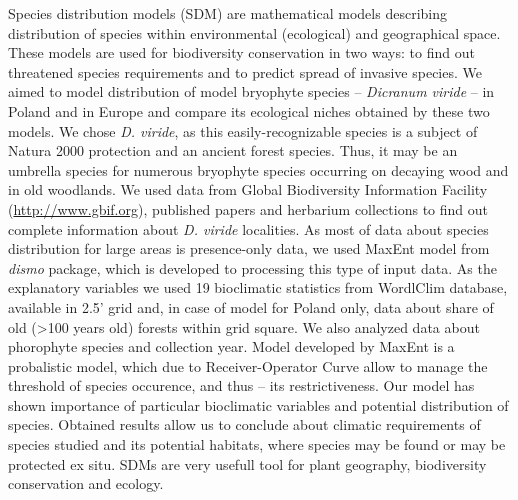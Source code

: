 \documentclass[\main/boa.tex]{subfiles}
\begin{document}
Species distribution models (SDM) are mathematical models describing
distribution of species within environmental (ecological) and
geographical space. These models are used for biodiversity conservation
in two ways: to find out threatened species requirements and to predict
spread of invasive species. We aimed to model distribution of model
bryophyte species -- \emph{Dicranum viride} -- in Poland and in Europe
and compare its ecological niches obtained by these two models. We chose
\emph{D. viride}, as this easily-recognizable species is a subject of
Natura 2000 protection and an ancient forest species. Thus, it may be an
umbrella species for numerous bryophyte species occurring on decaying
wood and in old woodlands. We used data from Global Biodiversity
Information Facility (\url{http://www.gbif.org}), published papers and
herbarium collections to find out complete information about \emph{D.
viride} localities. As most of data about species distribution for large
areas is presence-only data, we used MaxEnt model from \emph{dismo}
package, which is developed to processing this type of input data. As
the explanatory variables we used 19 bioclimatic statistics from
WordlClim database, available in 2.5' grid and, in case of model for
Poland only, data about share of old (\textgreater{}100 years old)
forests within grid square. We also analyzed data about phorophyte
species and collection year. Model developed by MaxEnt is a probalistic
model, which due to Receiver-Operator Curve allow to manage the
threshold of species occurence, and thus -- its restrictiveness. Our
model has shown importance of particular bioclimatic variables and
potential distribution of species. Obtained results allow us to conclude
about climatic requirements of species studied and its potential
habitats, where species may be found or may be protected ex situ. SDMs
are very usefull tool for plant geography, biodiversity conservation and
ecology.
\end{document}
